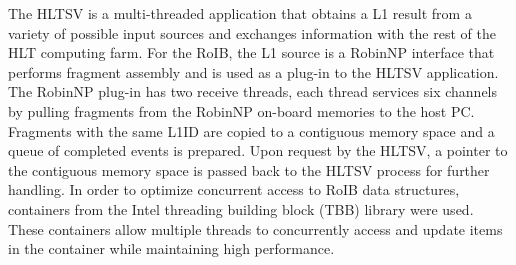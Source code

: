 The HLTSV is a multi-threaded application that obtains a L1 result from a variety of possible input sources and exchanges information with the 
rest of the HLT computing farm. 
For the RoIB, the L1 source is a RobinNP interface that performs fragment assembly and is used as a plug-in to the HLTSV application.
The RobinNP plug-in has two receive threads, each 
thread services six channels by pulling fragments from the RobinNP on-board memories to the host PC.
Fragments with the same L1ID are copied 
to a contiguous memory space and a queue of completed events is prepared. 
Upon request by the HLTSV, a pointer to the contiguous memory space is passed back to the 
HLTSV process for further handling. In order to optimize concurrent access to RoIB data structures, containers from the  Intel 
threading building block (TBB) library were used. These containers allow multiple threads to concurrently access and update items 
in the container while maintaining high performance.  
